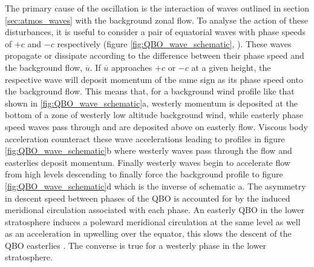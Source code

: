 {The primary cause of the oscillation is the interaction of waves outlined in section \ref{sec:atmos_waves} with the background zonal flow. To analyse the action of these disturbances, it is useful to consider a pair of equatorial waves with phase speeds of $+c $ and $-c$ respectively (figure \ref{fig:QBO_wave_schematic}, \cite{Plumb1984}). These waves propagate or dissipate according to the difference between their phase speed and the background flow, $\overbar{u}$. If $\overbar{u}$ approaches $+c$ or $-c$ at a given height, the respective wave will deposit momentum of the same sign as its phase speed onto the background flow. This means that, for a background wind profile like that shown in \ref{fig:QBO_wave_schematic}a, westerly momentum is deposited at the bottom of a zone of westerly low altitude background wind, while easterly phase speed waves pass through and are deposited above on easterly flow. Viscous body acceleration counteract these wave accelerations leading to profiles in figure \ref{fig:QBO_wave_schematic}b where westerly waves pass through the flow and easterlies deposit momentum. Finally westerly waves begin to accelerate flow from high levels descending to finally force the background profile to figure \ref{fig:QBO_wave_schematic}d which is the inverse of schematic a. The asymmetry in descent speed between phases of the QBO is accounted for by the induced meridional circulation associated with each phase. An easterly QBO in the lower stratosphere induces a poleward meridional circulation at the same level \citep{plumb82,Baldwin2001} as well as an acceleration in upwelling over the equator, this slows the descent of the QBO easterlies \citep{Reed1964}. The converse is true for a westerly phase in the lower stratosphere.

}
